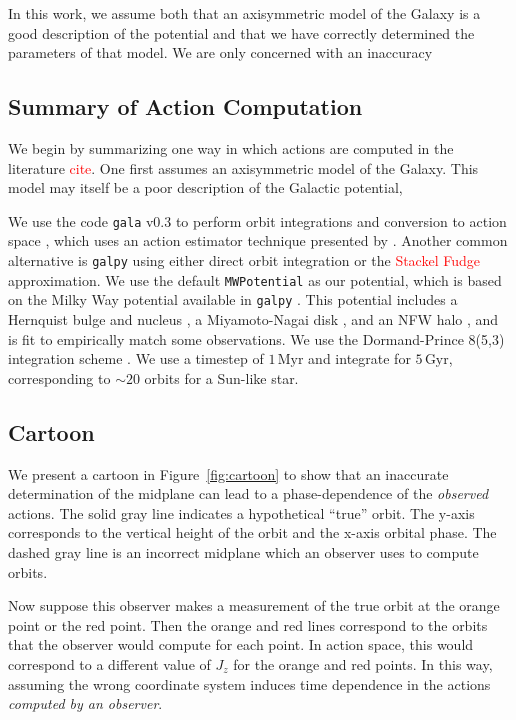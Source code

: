 \documentclass[twocolumn]{aastex62}
\newcommand{\Gus}[1]{\textcolor{red}{#1}}
\newcommand{\Myr}{\text{Myr}}
\newcommand{\Gyr}{\text{Gyr}}
\begin{document}
In this work, we assume both that an axisymmetric model of the Galaxy is a good description of the potential and that we have correctly determined the parameters of that model. We are only concerned with an inaccuracy

\subsection{Summary of Action Computation} \label{ssec:action_comp}
We begin by summarizing one way in which actions are computed in the
literature \Gus{cite}. One first assumes an axisymmetric model of the Galaxy.
This model may itself be a poor description of the Galactic potential,

We use the code \texttt{gala} v0.3 to perform orbit integrations and
conversion to action space \citep{2017JOSS....2..388P,Price-Whelan:2018},
which uses an action estimator technique presented by
\citet{2014MNRAS.441.3284S}. Another common alternative is \texttt{galpy}
\citep{2015ApJS..216...29B} using either direct orbit integration or the
\Gus{Stackel Fudge} approximation. We use the default \texttt{MWPotential} as
our potential, which is based on the Milky Way potential available in
\texttt{galpy} \citep{2015ApJS..216...29B}. This potential includes a
Hernquist bulge and nucleus \citep{1990ApJ...356..359H}, a Miyamoto-Nagai disk
\citep{1975PASJ...27..533M}, and an NFW halo \citep{1997ApJ...490..493N}, and
is fit to empirically match some observations. We use the Dormand-Prince
8(5,3) integration scheme \citep{Dormand80:integrator}. We use a timestep of
$1\,\Myr$ and integrate for $5\,\Gyr$, corresponding to $\sim 20$ orbits for a
Sun-like star.

\subsection{Cartoon} \label{ssec:cartoon}
We present a cartoon in Figure~\ref{fig:cartoon} to show that an inaccurate
determination of the midplane can lead to a phase-dependence of the {\em
observed} actions. The solid gray line indicates a hypothetical ``true''
orbit. The y-axis corresponds to the vertical height of the orbit and the
x-axis orbital phase. The dashed gray line is an incorrect midplane which an
observer uses to compute orbits.

Now suppose this observer makes a measurement of the true orbit at the orange
point or the red point. Then the orange and red lines correspond to the orbits
that the observer would compute for each point. In action space, this would
correspond to a different value of $J_z$ for the orange and red points. In
this way, assuming the wrong coordinate system induces time dependence in the
actions {\em computed by an observer}.
\end{document}
